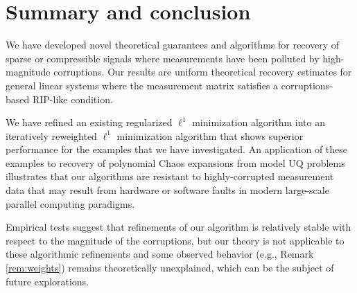 \section{Summary and conclusion}\label{sec:conclusion}
We have developed novel theoretical guarantees and algorithms for recovery of sparse or compressible signals where measurements have been polluted by high-magnitude corruptions. Our results are uniform theoretical recovery estimates for general linear systems where the measurement matrix satisfies a corruptions-based RIP-like condition. 

We have refined an existing regularized $\ell^1$ minimization algorithm into an iteratively reweighted $\ell^1$ minimization algorithm that shows superior performance for the examples that we have investigated. An application of these examples to recovery of polynomial Chaos expansions from model UQ problems illustrates that our algorithms are resistant to highly-corrupted measurement data that may result from hardware or software faults in modern large-scale parallel computing paradigms.

Empirical tests suggest that refinements of our algorithm is relatively stable with respect to the magnitude of the corruptions, but our theory is not applicable to these algorithmic refinements and some observed behavior (e.g., Remark \ref{rem:weights}) remains theoretically unexplained, which can be the subject of future explorations.

